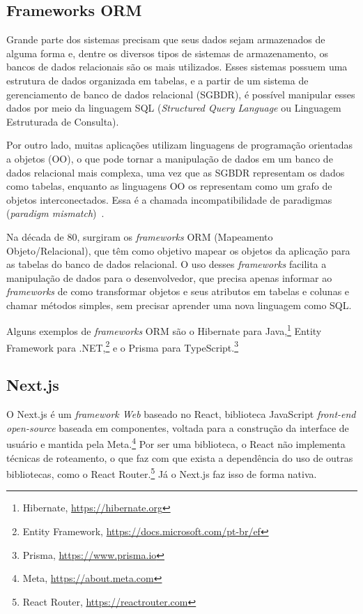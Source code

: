 \subsection{Frameworks ORM}
\label{sec-fundteo-framework-orm}

Grande parte dos sistemas precisam que seus dados sejam armazenados de alguma forma e,
dentre os diversos tipos de sistemas de armazenamento, os bancos de dados relacionais são
os mais utilizados. Esses sistemas possuem uma estrutura de dados organizada em tabelas, e a partir de 
um sistema de gerenciamento de banco de dados relacional (SGBDR), é possível manipular esses dados
por meio da linguagem SQL (\textit{Structured Query Language} ou Linguagem Estruturada de Consulta).

Por outro lado, muitas aplicações utilizam linguagens de programação orientadas a objetos (OO), o que
pode tornar a manipulação de dados em um banco de dados relacional mais complexa, uma vez que
as SGBDR representam os dados como tabelas, enquanto as linguagens OO os representam como um grafo 
de objetos interconectados. Essa é a chamada incompatibilidade de paradigmas (\textit{paradigm mismatch})~\cite{hibernate:2010,bauer:2005}.

Na década de 80, surgiram os \textit{frameworks} ORM (Mapeamento Objeto/Relacional), que têm como objetivo
mapear os objetos da aplicação para as tabelas do banco de dados relacional. O uso desses \textit{frameworks} 
facilita a manipulação de dados para o desenvolvedor, que precisa apenas informar ao \textit{frameworks} de
como transformar objetos e seus atributos em tabelas e colunas e chamar métodos simples, sem precisar
aprender uma nova linguagem como SQL.

Alguns exemplos de \textit{frameworks} ORM são o Hibernate para Java,\footnote{Hibernate, \url{https://hibernate.org}}
Entity Framework para .NET,\footnote{Entity Framework, \url{https://docs.microsoft.com/pt-br/ef}} e o 
Prisma para TypeScript.\footnote{Prisma, \url{https://www.prisma.io}}



\subsection{Next.js}
\label{sec-fundteo-framework-next}



O Next.js é um \textit{framework Web} baseado no React, biblioteca JavaScript \textit{front-end open-source}
baseada em componentes, voltada para a construção da interface de usuário e mantida pela Meta.\footnote{Meta, \url{https://about.meta.com}}
Por ser uma biblioteca, o React não implementa 
técnicas de roteamento, o que faz com que exista a dependência do uso de outras bibliotecas, 
como o React Router.\footnote{React Router, \url{https://reactrouter.com}}
Já o Next.js faz isso de forma nativa. 

